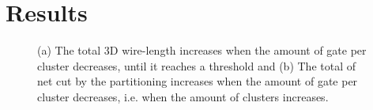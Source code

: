 \documentclass[conference]{IEEEtran}
\begin{document}
\section{Results}\label{sec:res}




\begin{figure}
  \centering
  \hfill
  \caption{(a) The total 3D wire-length increases when the amount of gate per cluster decreases, until it reaches a threshold and (b) The total of net cut by the partitioning increases when the amount of gate per cluster decreases, i.e. when the amount of clusters increases.}
  \label{fig:3Dnets}
\end{figure} 
\end{document}
